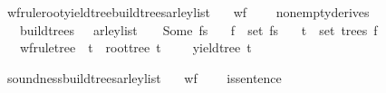 \begin{isabellebody}
\isadelimproof
%
\endisadelimproof
%
\isatagproof
%
\endisatagproof
{\isafoldproof}%
%
\isadelimproof
%
\endisadelimproof
%
\begin{isamarkuptext}%
%
\end{isamarkuptext}\isamarkuptrue%
\isamarkupfalse%
\ wf{\isacharunderscore}{\kern0pt}rule{\isacharunderscore}{\kern0pt}root{\isacharunderscore}{\kern0pt}yield{\isacharunderscore}{\kern0pt}tree{\isacharunderscore}{\kern0pt}build{\isacharunderscore}{\kern0pt}trees{\isacharunderscore}{\kern0pt}{\isasymE}arley{\isacharunderscore}{\kern0pt}list{\isacharcolon}{\kern0pt}\isanewline
\ \ \ {\isachardoublequoteopen}wf{\isacharunderscore}{\kern0pt}{\isasymG}\ {\isasymG}{\isachardoublequoteclose}\isanewline
\ \ \ {\isachardoublequoteopen}nonempty{\isacharunderscore}{\kern0pt}derives\ {\isasymG}{\isachardoublequoteclose}\isanewline
\ \ \ {\isachardoublequoteopen}build{\isacharunderscore}{\kern0pt}trees\ {\isasymG}\ {\isasymomega}\ {\isacharparenleft}{\kern0pt}{\isasymE}arley{\isacharunderscore}{\kern0pt}list\ {\isasymG}\ {\isasymomega}{\isacharparenright}{\kern0pt}\ {\isacharequal}{\kern0pt}\ Some\ fs{\isachardoublequoteclose}\isanewline
\ \ \ {\isachardoublequoteopen}f\ {\isasymin}\ set\ fs{\isachardoublequoteclose}\isanewline
\ \ \ {\isachardoublequoteopen}t\ {\isasymin}\ set\ {\isacharparenleft}{\kern0pt}trees\ f{\isacharparenright}{\kern0pt}{\isachardoublequoteclose}\isanewline
\ \ \ {\isachardoublequoteopen}wf{\isacharunderscore}{\kern0pt}rule{\isacharunderscore}{\kern0pt}tree\ {\isasymG}\ t\ {\isasymand}\ root{\isacharunderscore}{\kern0pt}tree\ t\ {\isacharequal}{\kern0pt}\ {\isasymSS}\ {\isasymG}\ {\isasymand}\ yield{\isacharunderscore}{\kern0pt}tree\ t\ {\isacharequal}{\kern0pt}\ {\isasymomega}{\isachardoublequoteclose}%
\isadelimproof
%
\endisadelimproof
%
\isatagproof
%
\endisatagproof
{\isafoldproof}%
%
\isadelimproof
%
\endisadelimproof
%
\begin{isamarkuptext}%
%
\end{isamarkuptext}\isamarkuptrue%
\isamarkupfalse%
\ soundness{\isacharunderscore}{\kern0pt}build{\isacharunderscore}{\kern0pt}trees{\isacharunderscore}{\kern0pt}{\isasymE}arley{\isacharunderscore}{\kern0pt}list{\isacharcolon}{\kern0pt}\isanewline
\ \ \ {\isachardoublequoteopen}wf{\isacharunderscore}{\kern0pt}{\isasymG}\ {\isasymG}{\isachardoublequoteclose}\isanewline
\ \ \ {\isachardoublequoteopen}is{\isacharunderscore}{\kern0pt}sentence\ {\isasymG}\ {\isasymomega}{\isachardoublequoteclose}\isanewline

\end{isabellebody}
